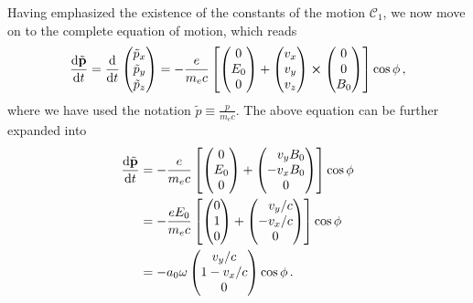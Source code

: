 \documentclass[12pt, class=report, crop=false]{standalone}
\begin{document}
Having emphasized the existence of the constants of the motion \(\mathcal{C}_1\),
we now move on to the complete equation of motion, which reads
\[
\dv{\tilde{\vb{p}}}{t} = \dv{t}
\begin{pmatrix}
  \tilde{p}_x \\
  \tilde{p}_y \\
  \tilde{p}_z
\end{pmatrix} =
- \frac{e}{m_e c} \left[
\begin{pmatrix}
  0 \\ E_0 \\ 0
\end{pmatrix}
+
\begin{pmatrix}
  v_x \\ v_y \\ v_z
\end{pmatrix}
\cp
\begin{pmatrix}
  0 \\ 0 \\ B_0
\end{pmatrix}
\right] \cos{\phi}\,,
\]
where we have used the notation \(\tilde{p} \equiv \frac{p}{m_e c}\). The above
equation can be further expanded into
\begin{equation}
\label{eq:normalized-lorentz}
\begin{aligned}
  \dv{\tilde{\vb{p}}}{t} &= - \frac{e}{m_e c} \left[
  \begin{pmatrix}
    0 \\ E_0 \\0
  \end{pmatrix}
  +
  \begin{pmatrix}
    \phantom{-}v_y B_0 \\
    -v_x B_0 \\
    0
  \end{pmatrix}
  \right] \cos{\phi} \\ &=
  - \frac{e E_0}{m_e c} \left[
  \begin{pmatrix}
    0 \\ 1 \\ 0
  \end{pmatrix}
  +
  \begin{pmatrix}
    \phantom{-}v_y / c \\
    -v_x/c \\
    0
  \end{pmatrix}
  \right] \cos{\phi} \\ &=
  -a_0\omega
  \begin{pmatrix}
    v_y / c \\
    1-v_x/c \\
    0
  \end{pmatrix}
  \cos{\phi}\,.
\end{aligned}
\end{equation}
\end{document}
